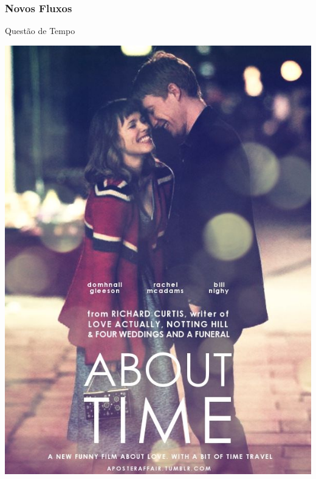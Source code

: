 \begin{frame}
    \frametitle{Novos Fluxos}
    
    \alert{Questão de Tempo}

    \includegraphics[height=0.8\textheight]{img/posters/about_time.jpg}
\end{frame}

